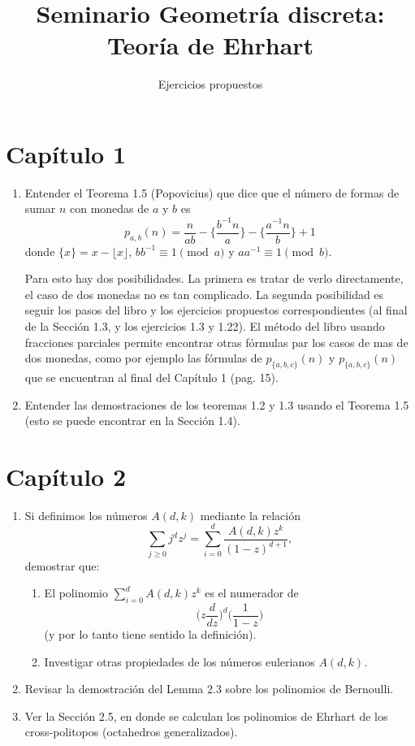 \documentclass[a4paper,11pt]{article}
\title{Seminario Geometría discreta: Teoría de Ehrhart}
\author{Ejercicios propuestos}
\date{}
\begin{document}
\maketitle
\section{Capítulo 1}
\begin{enumerate}
 \item Entender el Teorema 1.5 (Popovicius) que dice que el número de formas de sumar $n$ con monedas de $a$ y $b$ es 
 $$p_{a,b}(n)=\frac{n}{ab}-\bigg\{\frac{b^{-1}n}{a}\bigg\}-\bigg\{\frac{a^{-1}n}{b}\bigg\}+1$$
 donde $\{x\}=x-\lfloor x \rfloor$,  $bb^{-1}  \equiv 1 \pmod{a}$ y $aa^{-1}  \equiv 1 \pmod{b}.$
 
 Para esto hay dos posibilidades. La primera es tratar de verlo directamente, el caso de dos monedas no es tan complicado.
 La segunda posibilidad es seguir los pasos del libro y los ejercicios propuestos correspondientes (al final de la Sección 1.3, y los ejercicios 1.3 y 1.22). El método del libro usando fracciones parciales
 permite encontrar otras fórmulas par los casos de mas de dos monedas, como por ejemplo las fórmulas de $p_{\{a,b,c\}}(n)$ y $p_{\{a,b,c\}}(n)$ que se encuentran al final del Capítulo 1 (pag. 15). 
 
 
 \item Entender las demostraciones de los teoremas 1.2 y 1.3 usando el Teorema 1.5 (esto se puede encontrar en la Sección 1.4).  
\end{enumerate}

 
 \section{Capítulo 2}
\begin{enumerate}
\item Si definimos los números $A(d,k)$ mediante la relación $$\sum_{j\ge 0}j^dz^j=  \sum_{i=0}^d \frac{A(d, k) z^k}{(1 - z)^{d+1}},$$ demostrar que:
  \begin{enumerate}
   \item El polinomio $\sum_{i=0}^d {A(d, k) z^k}$ es el numerador de $$\bigg(z\frac{d}{dz}\bigg)^d\bigg(\frac{1}{1-z}\bigg)$$ (y por lo tanto tiene sentido la definición).
   \item Investigar otras propiedades de los números eulerianos $A(d,k)$.
\end{enumerate}

\item Revisar la demostración del Lemma 2.3 sobre los polinomios de Bernoulli.

\item Ver la Sección 2.5, en donde se calculan los polinomios de Ehrhart de los cross-politopos (octahedros generalizados).
\end{enumerate}
\end{document}
